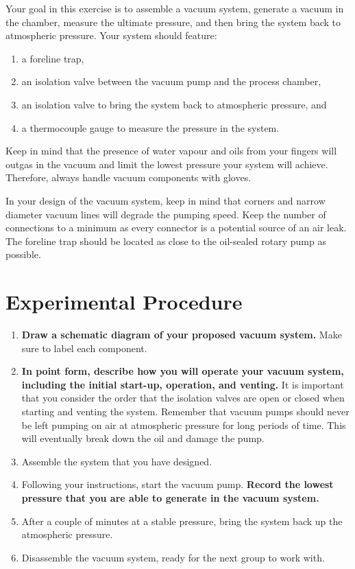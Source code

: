 Your goal in this exercise is to assemble a vacuum system, generate a vacuum in the chamber, measure the ultimate pressure, and then bring the system back to atmospheric pressure. Your system should feature:
\begin{enumerate}[label={(\arabic*)}]
\item a foreline trap,
\item an isolation valve between the vacuum pump and the process chamber,
\item an isolation valve to bring the system back to atmospheric pressure, and
\item a thermocouple gauge to measure the pressure in the system. 
\end{enumerate}
Keep in mind that the presence of water vapour and oils from your fingers will outgas in the vacuum and limit the lowest pressure your system will achieve. Therefore, always handle vacuum components with gloves.

In your design of the vacuum system, keep in mind that corners and narrow diameter vacuum lines will degrade the pumping speed. Keep the number of connections to a minimum as every connector is a potential source of an air leak. The foreline trap should be located as close to the oil-sealed rotary pump as possible.

\section{Experimental Procedure}
\begin{enumerate}
\item {\bf Draw a schematic diagram of your proposed vacuum system.}  Make sure to label each component.

\item {\bf In point form, describe how you will operate your vacuum system, including the initial start-up, operation, and venting.}  It is important that you consider the order that the isolation valves are open or closed when starting and venting the system.  Remember that vacuum pumps should never be left pumping on air at atmospheric pressure for long periods of time.  This will eventually break down the oil and damage the pump.

\item Assemble the system that you have designed.

\item Following your instructions, start the vacuum pump. {\bf Record the lowest pressure that you are able to generate in the vacuum system.}

\item After a couple of minutes at a stable pressure, bring the system back up the atmospheric pressure.

\item Disassemble the vacuum system, ready for the next group to work with.
\end{enumerate}

